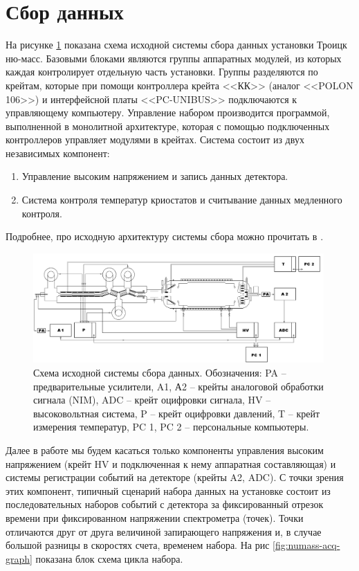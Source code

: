 \documentclass[a4paper,14pt]{extreport}
\begin{document}
\section{Сбор данных}

На рисунке \ref{fig:numass-acquisition-old} показана схема исходной системы сбора данных установки Троицк ню-масс. Базовыми блоками являются группы аппаратных модулей, из которых каждая контролирует отдельную часть установки. Группы разделяются по крейтам, которые при помощи контроллера крейта <<КК>> (аналог <<POLON 106>>) и интерфейсной платы <<PC-UNIBUS>> подключаются к управляющему компьютеру. Управление набором производится программой, выполненной в монолитной архитектуре, которая с помощью подключенных контроллеров управляет модулями в крейтах. Система состоит из двух независимых компонент:
\begin{enumerate}
    \item Управление высоким напряжением и запись данных детектора.
    \item Система контроля температур криостатов и  считывание данных медленного контроля.
\end{enumerate}
Подробнее, про исходную архитектуру системы сбора можно прочитать в \cite{zadorogny}.

\begin{figure}
  \centering
  \includegraphics[width = 0.99\textwidth]{img/nu_mass_setup/acquisition-old.png}
    \caption{Схема исходной системы сбора данных. Обозначения: PA – предварительные усилители, A1, А2 – крейты аналоговой обработки сигнала (NIM), ADC – крейт оцифровки сигнала, HV – высоковольтная система, P – крейт оцифровки давлений, T – крейт измерения температур, PC 1, PC 2 – персональные компьютеры.}
    \label{fig:numass-acquisition-old}
\end{figure}

Далее в работе мы будем касаться только компоненты управления высоким напряжением (крейт HV и подключенная к нему аппаратная составляющая) и системы регистрации событий на детекторе (крейты A2, ADC). С точки зрения этих компонент, типичный сценарий набора данных на установке состоит из последовательных наборов событий с детектора за фиксированный отрезок времени при фиксированном напряжении спектрометра (точек). Точки отличаются друг от друга величиной запирающего напряжения и, в случае большой разницы в скоростях счета, временем набора. На рис \ref{fig:numass-acq-graph} показана блок схема цикла набора.
\end{document}
